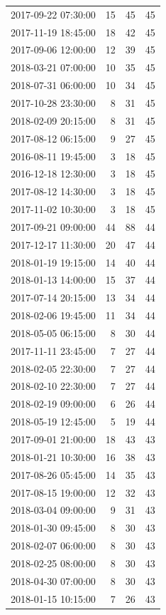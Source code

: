 \begin{tabular}{lrrr}
2017-09-22 07:30:00 & 15 & 45 & 45 \\
2017-11-19 18:45:00 & 18 & 42 & 45 \\
2017-09-06 12:00:00 & 12 & 39 & 45 \\
2018-03-21 07:00:00 & 10 & 35 & 45 \\
2018-07-31 06:00:00 & 10 & 34 & 45 \\
2017-10-28 23:30:00 & 8 & 31 & 45 \\
2018-02-09 20:15:00 & 8 & 31 & 45 \\
2017-08-12 06:15:00 & 9 & 27 & 45 \\
2016-08-11 19:45:00 & 3 & 18 & 45 \\
2016-12-18 12:30:00 & 3 & 18 & 45 \\
2017-08-12 14:30:00 & 3 & 18 & 45 \\
2017-11-02 10:30:00 & 3 & 18 & 45 \\
2017-09-21 09:00:00 & 44 & 88 & 44 \\
2017-12-17 11:30:00 & 20 & 47 & 44 \\
2018-01-19 19:15:00 & 14 & 40 & 44 \\
2018-01-13 14:00:00 & 15 & 37 & 44 \\
2017-07-14 20:15:00 & 13 & 34 & 44 \\
2018-02-06 19:45:00 & 11 & 34 & 44 \\
2018-05-05 06:15:00 & 8 & 30 & 44 \\
2017-11-11 23:45:00 & 7 & 27 & 44 \\
2018-02-05 22:30:00 & 7 & 27 & 44 \\
2018-02-10 22:30:00 & 7 & 27 & 44 \\
2018-02-19 09:00:00 & 6 & 26 & 44 \\
2018-05-19 12:45:00 & 5 & 19 & 44 \\
2017-09-01 21:00:00 & 18 & 43 & 43 \\
2018-01-21 10:30:00 & 16 & 38 & 43 \\
2017-08-26 05:45:00 & 14 & 35 & 43 \\
2017-08-15 19:00:00 & 12 & 32 & 43 \\
2018-03-04 09:00:00 & 9 & 31 & 43 \\
2018-01-30 09:45:00 & 8 & 30 & 43 \\
2018-02-07 06:00:00 & 8 & 30 & 43 \\
2018-02-25 08:00:00 & 8 & 30 & 43 \\
2018-04-30 07:00:00 & 8 & 30 & 43 \\
2018-01-15 10:15:00 & 7 & 26 & 43 \\

\end{tabular}
